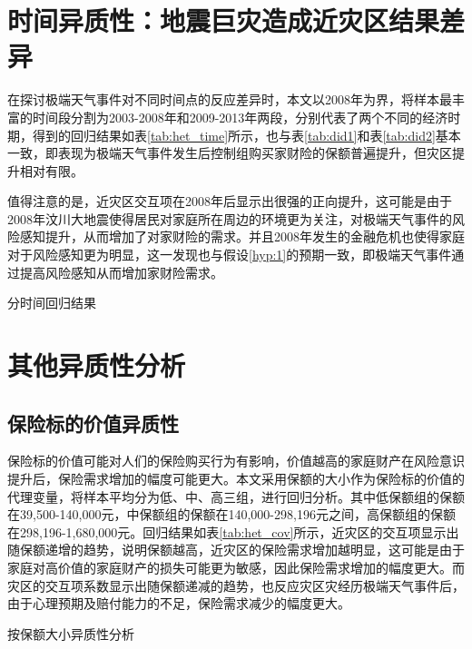 \section{时间异质性：地震巨灾造成近灾区结果差异}

在探讨极端天气事件对不同时间点的反应差异时，本文以2008年为界，将样本最丰富的时间段分割为2003-2008年和2009-2013年两段，分别代表了两个不同的经济时期，得到的回归结果如表\ref{tab:het_time}所示，也与表\ref{tab:did1}和表\ref{tab:did2}基本一致，即表现为极端天气事件发生后控制组购买家财险的保额普遍提升，但灾区提升相对有限。

值得注意的是，近灾区交互项在2008年后显示出很强的正向提升，这可能是由于2008年汶川大地震使得居民对家庭所在周边的环境更为关注，对极端天气事件的风险感知提升，从而增加了对家财险的需求。并且2008年发生的金融危机也使得家庭对于风险感知更为明显，这一发现也与假设\ref{hyp:1}的预期一致，即极端天气事件通过提高风险感知从而增加家财险需求。
\begin{table}[H]
    \centering
    \caption{分时间回归结果}\label{tab:het_time}
    
\end{table}

\section{其他异质性分析}
\subsection{保险标的价值异质性}
保险标的价值可能对人们的保险购买行为有影响，价值越高的家庭财产在风险意识提升后，保险需求增加的幅度可能更大。本文采用保额的大小作为保险标的价值的代理变量，将样本平均分为低、中、高三组，进行回归分析。其中低保额组的保额在39,500-140,000元，中保额组的保额在140,000-298,196元之间，高保额组的保额在298,196-1,680,000元。回归结果如表\ref{tab:het_cov}所示，近灾区的交互项显示出随保额递增的趋势，说明保额越高，近灾区的保险需求增加越明显，这可能是由于家庭对高价值的家庭财产的损失可能更为敏感，因此保险需求增加的幅度更大。而灾区的交互项系数显示出随保额递减的趋势，也反应灾区灾经历极端天气事件后，由于心理预期及赔付能力的不足，保险需求减少的幅度更大。
\begin{table}
    \centering
    \caption{按保额大小异质性分析}\label{tab:het_cov}
    
\end{table}

